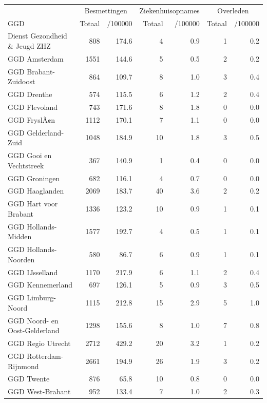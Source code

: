 \documentclass[
  english,
  man,floatsintext]{apa6}
\begin{document}
\begin{table}
\centering\begingroup\fontsize{10}{12}\selectfont

\begin{threeparttable}
\begin{tabular}{lrrrrrr}
\toprule
\multicolumn{1}{c}{ } & \multicolumn{2}{c}{Besmettingen} & \multicolumn{2}{c}{Ziekenhuisopnames} & \multicolumn{2}{c}{Overleden} \\
\cmidrule(l{3pt}r{3pt}){2-3} \cmidrule(l{3pt}r{3pt}){4-5} \cmidrule(l{3pt}r{3pt}){6-7}
GGD & Totaal & /100000 & Totaal & /100000 & Totaal & /100000\\
\midrule
Dienst Gezondheid \& Jeugd ZHZ & 808 & 174.6 & 4 & 0.9 & 1 & 0.2\\
GGD Amsterdam & 1551 & 144.6 & 5 & 0.5 & 2 & 0.2\\
GGD Brabant-Zuidoost & 864 & 109.7 & 8 & 1.0 & 3 & 0.4\\
GGD Drenthe & 574 & 115.5 & 6 & 1.2 & 2 & 0.4\\
GGD Flevoland & 743 & 171.6 & 8 & 1.8 & 0 & 0.0\\
GGD FryslÃ¢n & 1112 & 170.1 & 7 & 1.1 & 0 & 0.0\\
GGD Gelderland-Zuid & 1048 & 184.9 & 10 & 1.8 & 3 & 0.5\\
GGD Gooi en Vechtstreek & 367 & 140.9 & 1 & 0.4 & 0 & 0.0\\
GGD Groningen & 682 & 116.1 & 4 & 0.7 & 0 & 0.0\\
GGD Haaglanden & 2069 & 183.7 & 40 & 3.6 & 2 & 0.2\\
GGD Hart voor Brabant & 1336 & 123.2 & 10 & 0.9 & 1 & 0.1\\
GGD Hollands-Midden & 1577 & 192.7 & 4 & 0.5 & 1 & 0.1\\
GGD Hollands-Noorden & 580 & 86.7 & 6 & 0.9 & 1 & 0.1\\
GGD IJsselland & 1170 & 217.9 & 6 & 1.1 & 2 & 0.4\\
GGD Kennemerland & 697 & 126.1 & 5 & 0.9 & 3 & 0.5\\
GGD Limburg-Noord & 1115 & 212.8 & 15 & 2.9 & 5 & 1.0\\
GGD Noord- en Oost-Gelderland & 1298 & 155.6 & 8 & 1.0 & 7 & 0.8\\
GGD Regio Utrecht & 2712 & 429.2 & 20 & 3.2 & 1 & 0.2\\
GGD Rotterdam-Rijnmond & 2661 & 194.9 & 26 & 1.9 & 3 & 0.2\\
GGD Twente & 876 & 65.8 & 10 & 0.8 & 0 & 0.0\\
GGD West-Brabant & 952 & 133.4 & 7 & 1.0 & 2 & 0.3\\

\end{tabular}
\end{threeparttable}
\end{table}
\end{document}
